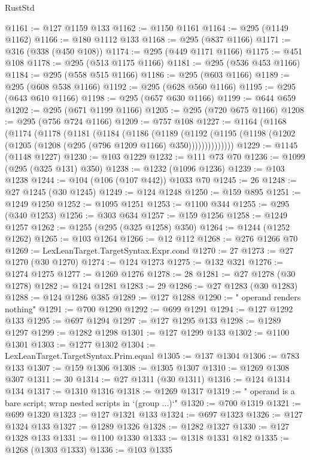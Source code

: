 \begin{lexlean}{RustStd}
\begin{coremodule}
@1161 := @127 @1159 @133
@1162 := @1150 @1161
@1164 := @295 (@1149 @1162)
@1166 := @180 @1112 @133
@1168 := @295 (@837 @1166)
@1171 := @316 (@338 (@450 @108))
@1174 := @295 (@449 @1171 @1166)
@1175 := @451 @108
@1178 := @295 (@513 @1175 @1166)
@1181 := @295 (@536 @453 @1166)
@1184 := @295 (@558 @515 @1166)
@1186 := @295 (@603 @1166)
@1189 := @295 (@608 @538 @1166)
@1192 := @295 (@628 @560 @1166)
@1195 := @295 (@643 @610 @1166)
@1198 := @295 (@657 @630 @1166)
@1199 := @644 @659
@1202 := @295 (@671 @1199 @1166)
@1205 := @295 (@720 @675 @1166)
@1208 := @295 (@756 @724 @1166)
@1209 := @757 @108
@1227 := @1164
    (@1168
      (@1174
        (@1178
          (@1181
            (@1184
              (@1186
                (@1189
                  (@1192
                    (@1195 (@1198 (@1202 (@1205 (@1208 (@295 (@796 @1209 @1166) @350))))))))))))))
@1229 := @1145 (@1148 @1227)
@1230 := @103 @1229
@1232 := @111 @73 @70
@1236 := @1099 (@295 (@325 @131) @350)
@1238 := @1232 (@1096 @1236)
@1239 := @103 @1238
@1244 := @104 (@106 (@107 @442)) @1033 @70
@1245 := 26
@1248 := @27 @1245 (@30 @1245)
@1249 := @124 @1248
@1250 := @159 @895
@1251 := @1249 @1250
@1252 := @1095 @1251
@1253 := @1100 @344
@1255 := @295 (@340 @1253)
@1256 := @303 @634
@1257 := @159 @1256
@1258 := @1249 @1257
@1262 := @1255 (@295 (@325 @1258) @350)
@1264 := @1244 (@1252 @1262)
@1265 := @103 @1264
@1266 := @12 @112
@1268 := @276 @1266 @70
@1269 := LexLeanTarget.TargetSyntax.Expr.cond
@1270 := 27
@1273 := @27 @1270 (@30 @1270)
@1274 := @124 @1273
@1275 := @132 @321
@1276 := @1274 @1275
@1277 := @1269 @1276
@1278 := 28
@1281 := @27 @1278 (@30 @1278)
@1282 := @124 @1281
@1283 := 29
@1286 := @27 @1283 (@30 @1283)
@1288 := @124 @1286 @385
@1289 := @127 @1288
@1290 := " operand renders nothing"
@1291 := @700 @1290
@1292 := @699 @1291
@1294 := @127 @1292 @133
@1295 := @697 @1294
@1297 := @127 @1295 @133
@1298 := @1289 @1297
@1299 := @1282 @1298
@1301 := @127 @1299 @133
@1302 := @1100 @1301
@1303 := @1277 @1302
@1304 := LexLeanTarget.TargetSyntax.Prim.equal
@1305 := @137 @1304
@1306 := @783 @133
@1307 := @159 @1306
@1308 := @1305 @1307
@1310 := @1269 @1308 @307
@1311 := 30
@1314 := @27 @1311 (@30 @1311)
@1316 := @124 @1314 @134
@1317 := @1310 @1316
@1318 := @1269 @1317
@1319 := " operand is a bare script; wrap nested scripts in `(group ...)`"
@1320 := @700 @1319
@1321 := @699 @1320
@1323 := @127 @1321 @133
@1324 := @697 @1323
@1326 := @127 @1324 @133
@1327 := @1289 @1326
@1328 := @1282 @1327
@1330 := @127 @1328 @133
@1331 := @1100 @1330
@1333 := @1318 @1331 @182
@1335 := @1268 (@1303 @1333)
@1336 := @103 @1335

\end{coremodule}
\end{lexlean}
